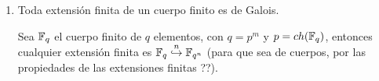 \begin{enumerate}
\begin{dem}
        $A\underset{k}{\otimes} L \simeq L^n \longrightarrow B \underset{k}{\otimes} L$ es epiyecci\'on de forma que  $B\underset{k}{\otimes} L = \modulo{L^n}{I}$ es un cociente con $I \subseteq L^n$ un ideal (de una $k$-\'algebra separable, por ser cuerpo), entonces $I = I_1 \times \cdots \times I_n \Rightarrow \modulo{L^n}{(I_1 \times \cdots \times I_n )} \simeq \modulo{L^n}{I_1}  \times \cdots \times \modulo{L^n}{I_n}$. Como $I_i\subset L$ es un ideal y $L$ es cuerpo, entonces $I_i=0$ \'o $I_i=L \Rightarrow B = L^s\times 0 \times \cdots \times 0 \simeq L^s$. 
    \end{dem}
    \item Toda extensi\'on finita de un cuerpo finito es de Galois.
    \begin{dem}
        Sea $\mathbb{F}_q$ el cuerpo finito de $q$ elementos, con $q=p^m$ y $p = ch(\mathbb{F}_q)$, entonces cualquier extensi\'on finita es $\mathbb{F}_q \overset{n}{\hookrightarrow} \mathbb{F}_{q^n}$ (para que sea de cuerpos, por las propiedades de las extensiones finitas ??). 
        

\end{dem}
\end{enumerate}
